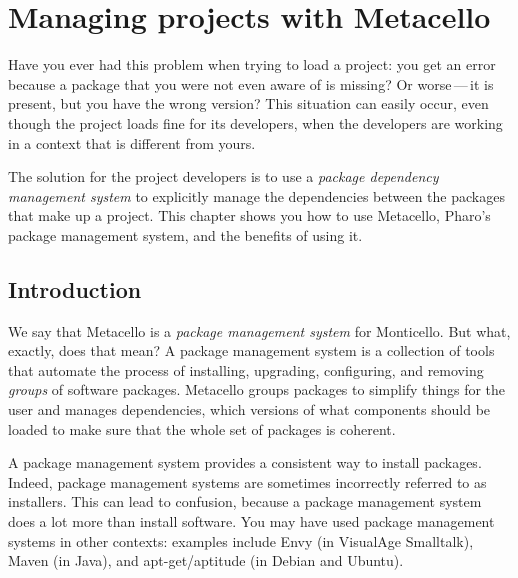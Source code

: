 \documentclass[a4paper,10pt,twoside]{book}
\begin{document}
\fi
\sloppy



\chapter{Managing projects with Metacello}
\chapterauthor{\authordale{} \\ \authormariano{}}

\noindent
Have you ever had this problem when trying to load a project: you get an error because a package that you were not even aware of is missing?  Or worse\,---\,it is present, but you have the wrong version? This situation can easily occur, even though the project loads fine for its developers, when the developers are working in a context that is different from yours. 

The solution for the project developers is to use a \emph{package dependency management system} to explicitly manage the dependencies between the packages that make up a project.  
This chapter shows you how to use Metacello, Pharo's package management system, and the benefits of using it. 

\section{Introduction}

We say that Metacello is a \emph{package management system} for Monticello. 
But what, exactly, does that mean?
A package management system is a collection of tools that automate the process of installing, upgrading, configuring, and removing \emph{groups} of software packages. Metacello groups packages to simplify things for the user and manages dependencies, \ie which versions of what components should be loaded to make sure that the whole set of packages is coherent. 

A package management system provides a consistent way to install packages. 
Indeed, package management systems are sometimes incorrectly referred to as installers. This can lead to confusion, because a package management system does a lot more than install software.  You may have used package management systems in other contexts: examples include Envy (in VisualAge Smalltalk), Maven (in Java), and apt-get/aptitude (in Debian and Ubuntu).
\end{document}
